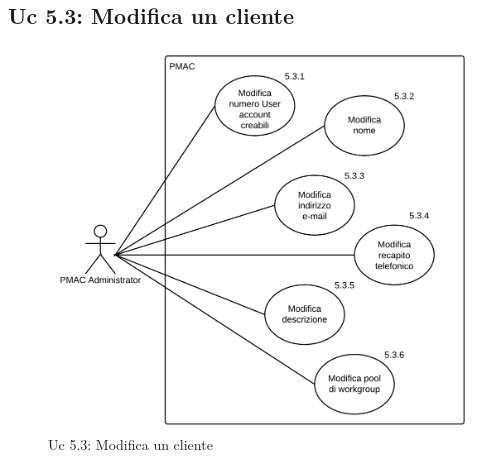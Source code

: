 \documentclass[10pt,a4paper]{article}
\begin{document}
\subsection{Uc 5.3: Modifica un cliente}
\begin{figure}[ht]
\centering
\caption{Uc 5.3: Modifica un cliente}
\includegraphics[scale=0.9]{UseCase/Uc5_3} %
\end{figure}
\end{document}
